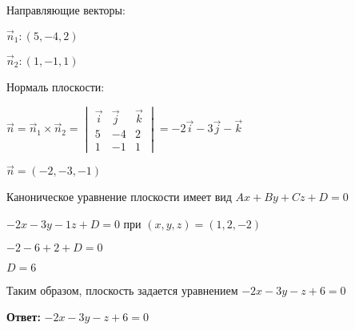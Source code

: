 Направляющие векторы:

$\vec n_1: (5, -4, 2)$ 

$\vec n_2: (1, -1, 1)$

Нормаль плоскости:

$\vec n = \vec n_1 \times \vec n_2 =
    \begin{vmatrix}
        \vec i & \vec j & \vec k \\
        5 & -4 & 2 \\
        1 & -1 & 1
    \end{vmatrix}
= -2 \vec i - 3\vec j - \vec k$

$\vec n = (-2, -3, -1)$

Каноническое уравнение плоскости имеет вид $Ax + By + Cz + D = 0$

$-2x -3y -1z + D = 0$ при $(x, y, z) = (1, 2, -2)$

$-2 - 6 + 2 + D = 0$

$D = 6$

Таким образом, плоскость задается уравнением $-2x - 3y -z + 6 = 0$

\textbf{Ответ:} $-2x - 3y -z + 6 = 0$
